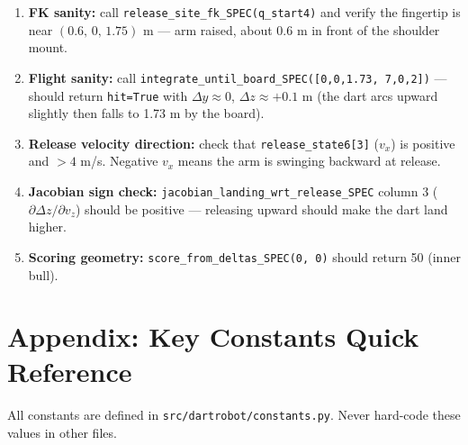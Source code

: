 \documentclass[11pt,letterpaper]{article}
\begin{document}
\begin{enumerate}
  \item \textbf{FK sanity:} call \texttt{release\_site\_fk\_SPEC(q\_start4)} and verify the fingertip is near $(0.6,\, 0,\, 1.75)$ m — arm raised, about 0.6 m in front of the shoulder mount.
  \item \textbf{Flight sanity:} call \texttt{integrate\_until\_board\_SPEC([0,0,1.73, 7,0,2])} — should return \texttt{hit=True} with $\Delta y \approx 0$, $\Delta z \approx +0.1$ m (the dart arcs upward slightly then falls to 1.73 m by the board).
  \item \textbf{Release velocity direction:} check that \texttt{release\_state6[3]} ($v_x$) is positive and $>4$ m/s. Negative $v_x$ means the arm is swinging backward at release.
  \item \textbf{Jacobian sign check:} \texttt{jacobian\_landing\_wrt\_release\_SPEC} column 3 ($\partial\Delta z/\partial v_z$) should be positive — releasing upward should make the dart land higher.
  \item \textbf{Scoring geometry:} \texttt{score\_from\_deltas\_SPEC(0, 0)} should return 50 (inner bull).
\end{enumerate}

\section*{Appendix: Key Constants Quick Reference}

All constants are defined in \texttt{src/dartrobot/constants.py}. Never hard-code these values in other files.
\end{document}
